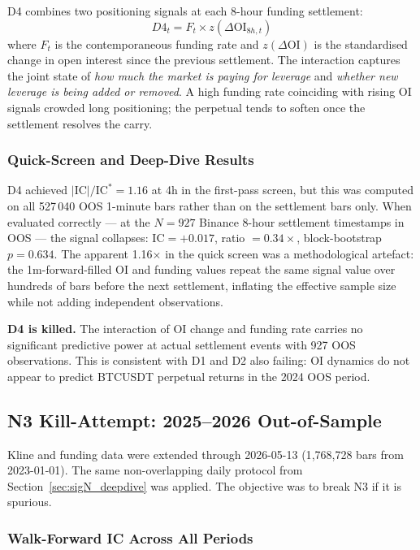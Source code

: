\documentclass[12pt, a4paper]{article}
\theoremstyle{definition}
\newcommand{\IC}{\mathrm{IC}}
\begin{document}
D4 combines two positioning signals at each 8-hour funding settlement:
\[
  D4_t = F_t \times z(\Delta\text{OI}_{8h,t})
\]
where $F_t$ is the contemporaneous funding rate and $z(\Delta\text{OI})$ is
the standardised change in open interest since the previous settlement.
The interaction captures the joint state of \emph{how much the market is
paying for leverage} and \emph{whether new leverage is being added or
removed}.  A high funding rate coinciding with rising OI signals crowded
long positioning; the perpetual tends to soften once the settlement resolves
the carry.

\subsubsection{Quick-Screen and Deep-Dive Results}

D4 achieved $|\IC|/\IC^* = 1.16$ at 4h in the first-pass screen, but this
was computed on all 527\,040 OOS 1-minute bars rather than on the
settlement bars only.  When evaluated correctly --- at the $N=927$
Binance 8-hour settlement timestamps in OOS --- the signal collapses:
$\IC = +0.017$, ratio $= 0.34\times$, block-bootstrap $p = 0.634$.
The apparent 1.16$\times$ in the quick screen was a methodological artefact:
the 1m-forward-filled OI and funding values repeat the same signal value
over hundreds of bars before the next settlement, inflating the effective
sample size while not adding independent observations.

\textbf{D4 is killed.}  The interaction of OI change and funding rate carries
no significant predictive power at actual settlement events with 927 OOS
observations.  This is consistent with D1 and D2 also failing: OI dynamics
do not appear to predict BTCUSDT perpetual returns in the 2024 OOS period.

\subsection{N3 Kill-Attempt: 2025--2026 Out-of-Sample}
\label{sec:n3_kill}

Kline and funding data were extended through 2026-05-13 (1{,}768{,}728 bars
from 2023-01-01).  The same non-overlapping daily protocol from
Section~\ref{sec:sigN_deepdive} was applied.  The objective was to break N3
if it is spurious.

\subsubsection{Walk-Forward IC Across All Periods}
\end{document}
